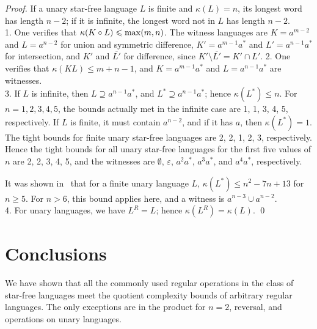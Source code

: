 \documentclass{llncs}
\renewcommand{\le}{\leqslant}
\renewcommand{\ge}{\geqslant}
\newcommand{\ol}{\overline}
\newcommand{\eps}{\varepsilon}
\newcommand{\emp}{\emptyset}
\begin{document}
\begin{proof} If a unary star-free language $L$ is finite and $\kappa(L)=n$, its longest word has length $n-2$; if it is infinite,   the longest word not in $L$ has length  $n-2$.\\
   1. 
One verifies that $\kappa(K\circ L)\le {\rm max}(m,n)$. 
The witness languages are  $K=a^{m-2}$ and $L=a^{n-2}$  for union and symmetric difference, 
$K'=a^{m-1}a^*$ and $L'=a^{n-1}a^*$ for intersection, and $K'$ and $\ol{L'}$ for difference, since $K'\setminus \ol{L'}=K'\cap L'$.
   2. 
One verifies that $\kappa(KL)\le m+n-1$, and   $K=a^{m-1}a^*$ and $L=a^{n-1}a^*$ are witnesses.\\
   3. 
 If $L$ is infinite, then $L\supseteq a^{n-1}a^*$, and $L^*\supseteq a^{n-1}a^*$; hence
$\kappa(L^*)\le n$.
For $n=1,2,3,4,5$, the bounds actually met in the infinite case are 1, 1, 3, 4, 5, respectively.
If $L$ is finite,  it must contain $a^{n-2}$, and if it has $a$, then $\kappa(L^*)=1$.
The tight bounds for finite unary star-free languages are
2, 2, 1, 2, 3, respectively. 
Hence the tight bounds for all unary star-free languages for the first five values of $n$ are 2, 2, 3, 4, 5, and the witnesses are $\emp$, $\eps$, $a^2a^*$, $a^3a^*$, and $a^4a^*$, respectively.

It was shown in~\cite{CCSY01} that for a finite unary language $L$, $\kappa(L^*)\le n^2-7n+13$ for $n\ge 5$. 
For $n>6$, this bound applies here, and
a witness is $a^{n-3}\cup a^{n-2}$.\\
   4. 
For unary languages, we have $L^R=L$; hence $\kappa(L^R)=\kappa(L)$.
\qed
\end{proof}



\section{Conclusions}
\label{sec:conclusions}

We have shown that all the commonly used regular operations in the class of star-free languages meet the quotient complexity bounds of arbitrary regular languages. The only exceptions are in the product for $n=2$, reversal, and operations on unary languages.
\end{document}
